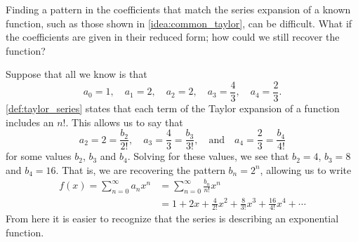
Finding a pattern in the coefficients that match the series expansion of a known function, such as those shown in \autoref{idea:common_taylor}, can be difficult. What if the coefficients %
are given in their reduced form; how could we still recover the function?%

Suppose that all we know is that 
\[a_0=1,\quad a_1=2,\quad a_2=2,\quad a_3=\frac43,\quad a_4=\frac23.\]
\autoref{def:taylor_series} states that each term of the Taylor expansion of a function includes an $n!$. This allows us to say that
\[a_2=2=\frac{b_2}{2!},\quad a_3 = \frac43=\frac{b_3}{3!},\quad \text{and}\quad a_4 = \frac23=\frac{b_4}{4!}\]
for some values $b_2$, $b_3$ and $b_4$.
Solving for these values, we see that $b_2=4$, $b_3 = 8$ and $b_4=16$. That is, we are recovering the pattern $b_n=2^n$, %
allowing us to write 
\begin{align*}
	f(x) = \sum_{n=0}^\infty a_nx^n
	&= \sum_{n=0}^\infty \frac{b_n}{n!}x^n \\
	&= 1+2x+ \frac{4}{2!}x^2 + \frac{8}{3!}x^3+\frac{16}{4!}x^4 + \dotsb
\end{align*}
From here it is easier to recognize that the series is describing an exponential function.


